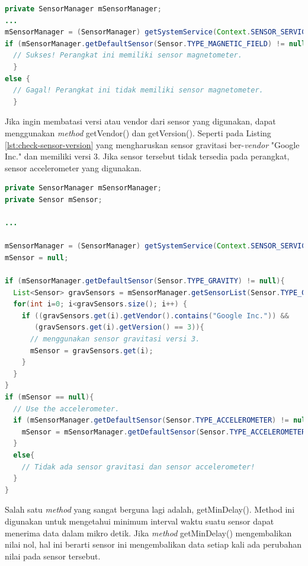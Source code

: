 \begin{lstlisting}[caption={Contoh untuk mengecek apakah perangkat yang digunakan memiliki sensor dengan jenis yang diberikan},label={lst:check-sensor},language=java]
private SensorManager mSensorManager;
...
mSensorManager = (SensorManager) getSystemService(Context.SENSOR_SERVICE);
if (mSensorManager.getDefaultSensor(Sensor.TYPE_MAGNETIC_FIELD) != null){
  // Sukses! Perangkat ini memiliki sensor magnetometer.
  }
else {
  // Gagal! Perangkat ini tidak memiliki sensor magnetometer.
  }
\end{lstlisting}

Jika ingin membatasi versi atau vendor dari sensor yang digunakan, dapat menggunakan \textit{method} getVendor() dan getVersion(). Seperti pada Listing \ref{lst:check-sensor-version} yang mengharuskan sensor gravitasi ber-\textit{vendor} "Google Inc." dan memiliki versi 3. Jika sensor tersebut tidak tersedia pada perangkat, sensor accelerometer yang digunakan.

\begin{lstlisting}[caption={Contoh untuk mengecek apakah perangkat yang digunakan memiliki sensor dengan jenis yang diberikan},label={lst:check-sensor-version},language=java]
private SensorManager mSensorManager;
private Sensor mSensor;

...

mSensorManager = (SensorManager) getSystemService(Context.SENSOR_SERVICE);
mSensor = null;

if (mSensorManager.getDefaultSensor(Sensor.TYPE_GRAVITY) != null){
  List<Sensor> gravSensors = mSensorManager.getSensorList(Sensor.TYPE_GRAVITY);
  for(int i=0; i<gravSensors.size(); i++) {
    if ((gravSensors.get(i).getVendor().contains("Google Inc.")) &&
       (gravSensors.get(i).getVersion() == 3)){
      // menggunakan sensor gravitasi versi 3.
      mSensor = gravSensors.get(i);
    }
  }
}
if (mSensor == null){
  // Use the accelerometer.
  if (mSensorManager.getDefaultSensor(Sensor.TYPE_ACCELEROMETER) != null){
    mSensor = mSensorManager.getDefaultSensor(Sensor.TYPE_ACCELEROMETER);
  }
  else{
    // Tidak ada sensor gravitasi dan sensor accelerometer!
  }
}
\end{lstlisting}

Salah satu \textit{method} yang sangat berguna lagi adalah, getMinDelay(). Method ini digunakan untuk mengetahui minimum interval waktu suatu sensor dapat menerima data dalam mikro detik. Jika \textit{method} getMinDelay() mengembalikan nilai nol, hal ini berarti sensor ini mengembalikan data setiap kali ada perubahan nilai pada sensor tersebut. 

